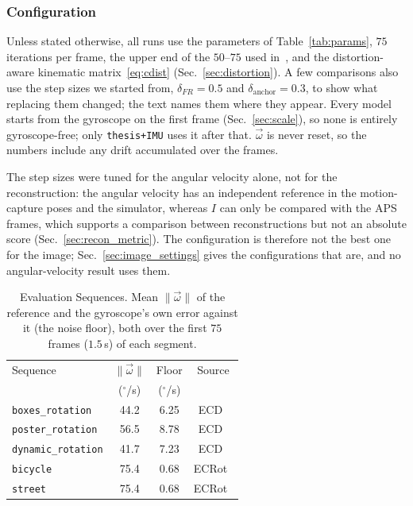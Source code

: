 \documentclass[journal]{IEEEtran}
\newcommand{\Imap}{I}
\newcommand{\wvec}{\vec{\omega}}
\begin{document}
\subsubsection{Configuration}
\label{sec:objective}

Unless stated otherwise, all runs use the parameters of Table~\ref{tab:params},
$75$ iterations per frame, the upper end of the $50$--$75$ used in~\cite{martel2019thesis}, and the distortion-aware kinematic
matrix~\eqref{eq:cdist} (Sec.~\ref{sec:distortion}). A few comparisons also use the step sizes we started from, $\delta_{F\!R} = 0.5$ and $\delta_{\text{anchor}} = 0.3$, to show what replacing them changed; the text
names them where they appear. Every model starts from the gyroscope on the
first frame (Sec.~\ref{sec:scale}), so none is entirely gyroscope-free; only
\texttt{thesis+IMU} uses it after that. $\wvec$ is never reset, so the numbers include any drift accumulated over the frames.

The step sizes were tuned for the angular velocity alone, not for the reconstruction: the angular velocity has an independent reference in the motion-capture poses and the simulator, whereas $\Imap$ can only be compared with the APS frames, which supports a comparison between reconstructions but not an absolute score (Sec.~\ref{sec:recon_metric}). The configuration is therefore not the best one for the image; Sec.~\ref{sec:image_settings} gives the configurations that are, and no angular-velocity result uses them.

\begin{table}[!t]
\renewcommand{\arraystretch}{1.2}
\caption{Evaluation Sequences. \textnormal{Mean $\|\wvec\|$ of the reference
and the gyroscope's own error against it (the noise floor), both over the
first $75$ frames ($1.5$\,s) of each segment.}}
\label{tab:datasets}
\centering
\footnotesize
\begin{tabular}{@{}lccc@{}}
\toprule
Sequence & $\|\wvec\|$ & Floor & Source \\
 & ($^\circ$/s) & ($^\circ$/s) & \\
\midrule
\texttt{boxes\_rotation}   & 44.2 & 6.25 & ECD~\cite{mueggler2017} \\
\texttt{poster\_rotation}  & 56.5 & 8.78 & ECD~\cite{mueggler2017} \\
\texttt{dynamic\_rotation} & 41.7 & 7.23 & ECD~\cite{mueggler2017} \\
\texttt{bicycle}           & 75.4 & 0.68 & ECRot~\cite{guo2024cmaxslam} \\
\texttt{street}            & 75.4 & 0.68 & ECRot~\cite{guo2024cmaxslam} \\
\bottomrule
\end{tabular}
\end{table}
\end{document}

